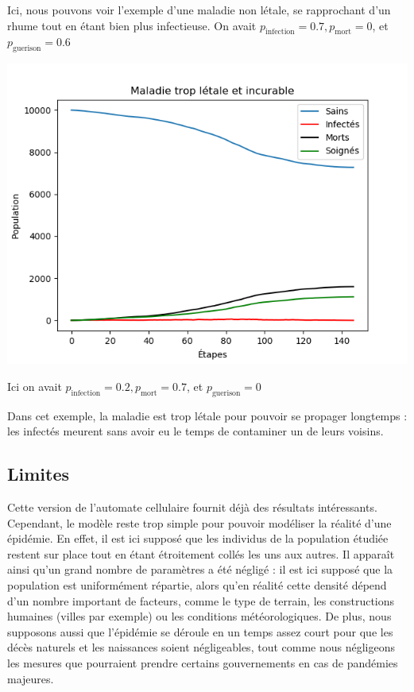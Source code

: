 \documentclass{article}
\begin{document}
	Ici, nous pouvons voir l'exemple d'une maladie non létale, se rapprochant d'un rhume tout en étant bien plus infectieuse. On avait $p_{\text{infection}} = 0.7, p_{\text{mort}} = 0$, et $p_{\text{guerison}} = 0.6$


\includegraphics[scale=1]{../images/Figure_3.png}

Ici on avait $p_{\text{infection}} = 0.2, p_{\text{mort}} = 0.7$, et $p_{\text{guerison}} = 0$



Dans cet exemple, la maladie est trop létale pour pouvoir se propager longtemps : les infectés meurent sans avoir eu le temps de contaminer un de leurs voisins.
\subsection{Limites}
	Cette version de l'automate cellulaire fournit déjà des résultats intéressants. Cependant, le modèle reste trop simple pour pouvoir modéliser la réalité d'une épidémie. En effet, il est ici supposé que les individus de la population étudiée restent sur place tout en étant étroitement collés les uns aux autres.
Il apparaît ainsi qu'un grand nombre de paramètres a été négligé : il est ici supposé que la population est uniformément répartie, alors qu'en réalité cette densité dépend d'un nombre important de facteurs, comme le type de terrain, les constructions humaines (villes par exemple) ou les conditions météorologiques. De plus, nous supposons aussi que l'épidémie se déroule en un temps assez court pour que les décès naturels et les naissances soient négligeables, tout comme nous négligeons les mesures que pourraient prendre certains gouvernements en cas de pandémies majeures.
	
\end{document}
